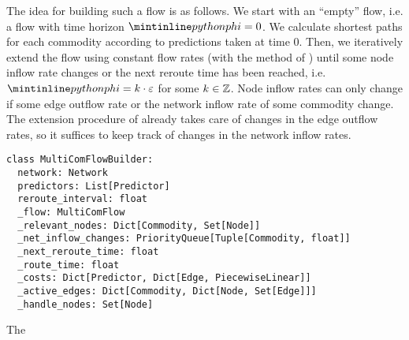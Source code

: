 The idea for building such a flow is as follows.
We start with an ``empty'' flow, i.e. a flow with time horizon $\code{phi}=0$.
We calculate shortest paths for each commodity according to predictions taken at time $0$.
Then, we iteratively extend the flow using constant flow rates (with the  method of )
until some node inflow rate changes or the next reroute time has been reached, i.e. $\code{phi} = k\cdot \varepsilon$ for some $k\in \mathbb{Z}$.
Node inflow rates can only change if some edge outflow rate or the network inflow rate of some commodity change.
The extension procedure of  already takes care of changes in the edge outflow rates, so it suffices to keep track of changes in the network inflow rates.  

\begin{classdef}
  \begin{verbatim}
class MultiComFlowBuilder:
  network: Network
  predictors: List[Predictor]
  reroute_interval: float
  _flow: MultiComFlow
  _relevant_nodes: Dict[Commodity, Set[Node]]
  _net_inflow_changes: PriorityQueue[Tuple[Commodity, float]]
  _next_reroute_time: float
  _route_time: float
  _costs: Dict[Predictor, Dict[Edge, PiecewiseLinear]]
  _active_edges: Dict[Commodity, Dict[Node, Set[Edge]]]
  _handle_nodes: Set[Node]
\end{verbatim}
    \caption{The }%
    \label{data:multi-com-flow-builder}
\end{classdef}

